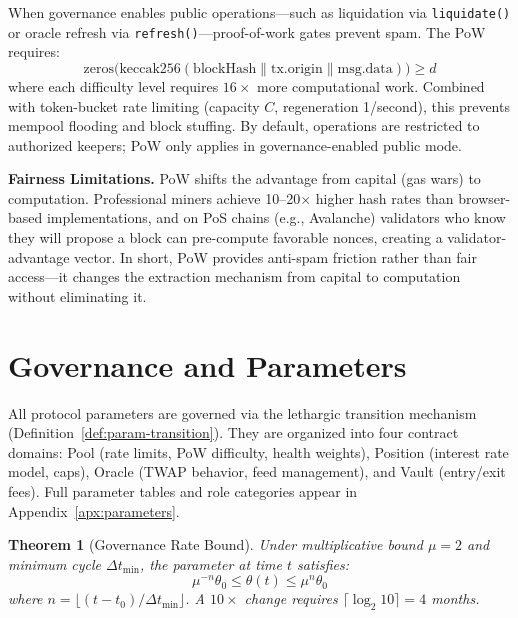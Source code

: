 \documentclass[10pt,a4paper,twocolumn]{article}
\theoremstyle{definition}
\theoremstyle{plain}
\newtheorem{theorem}{Theorem}[section]
\theoremstyle{remark}
\begin{document}
When governance enables public operations---such as liquidation via \texttt{liquidate()} or oracle refresh via \texttt{refresh()}---proof-of-work gates prevent spam. The PoW requires:
\begin{equation}
\text{zeros}\bigl(\text{keccak256}(\text{blockHash} \| \text{tx.origin} \| \text{msg.data})\bigr) \geq d
\end{equation}
where each difficulty level requires $16\times$ more computational work. Combined with token-bucket rate limiting (capacity $C$, regeneration 1/second), this prevents mempool flooding and block stuffing. By default, operations are restricted to authorized keepers; PoW only applies in governance-enabled public mode.

\textbf{Fairness Limitations.} PoW shifts the advantage from capital (gas wars) to computation. Professional miners achieve 10--20$\times$ higher hash rates than browser-based implementations, and on PoS chains (e.g., Avalanche) validators who know they will propose a block can pre-compute favorable nonces, creating a validator-advantage vector. In short, PoW provides anti-spam friction rather than fair access---it changes the extraction mechanism from capital to computation without eliminating it.

\section{Governance and Parameters}
\label{sec:governance}

All protocol parameters are governed via the lethargic transition mechanism (Definition~\ref{def:param-transition}). They are organized into four contract domains: Pool (rate limits, PoW difficulty, health weights), Position (interest rate model, caps), Oracle (TWAP behavior, feed management), and Vault (entry/exit fees). Full parameter tables and role categories appear in Appendix~\ref{apx:parameters}.

\begin{theorem}[Governance Rate Bound]
\label{thm:governance}
Under multiplicative bound $\mu = 2$ and minimum cycle $\Delta t_{\min}$, the parameter at time $t$ satisfies:
\begin{equation}
\mu^{-n} \theta_0 \leq \theta(t) \leq \mu^n \theta_0
\end{equation}
where $n = \lfloor(t{-}t_0)/\Delta t_{\min}\rfloor$. A $10\times$ change requires $\lceil\log_2 10\rceil = 4$ months.
\end{theorem}
\end{document}
